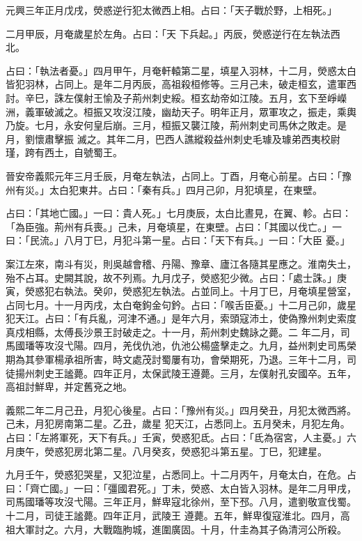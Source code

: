 \begin{pinyinscope}
 元興三年正月戊戌，熒惑逆行犯太微西上相。占曰：「天子戰於野，上相死。」



 二月甲辰，月奄歲星於左角。占曰：「天
 下兵起。」丙辰，熒惑逆行在左執法西北。



 占曰：「執法者憂。」四月甲午，月奄軒轅第二星，填星入羽林，十二月，熒惑太白皆犯羽林，占同上。是年二月丙辰，高祖殺桓修等。三月己未，破走桓玄，遣軍西討。辛巳，誅左僕射王愉及子荊州刺史綏。桓玄劫帝如江陵。五月，玄下至崢嶸洲，義軍破滅之。桓振又攻沒江陵，幽劫天子。明年正月，眾軍攻之，振走，乘輿乃旋。七月，永安何皇后崩。三月，桓振又襲江陵，荊州刺史司馬休之敗走。是月，劉懷肅擊振
 滅之。其年二月，巴西人譙縱殺益州刺史毛璩及璩弟西夷校尉瑾，跨有西土，自號蜀王。



 晉安帝義熙元年三月壬辰，月奄左執法，占同上。丁酉，月奄心前星。占曰：「豫州有災。」太白犯東井。占曰：「秦有兵。」四月己卯，月犯填星，在東壁。



 占曰：「其地亡國。」一曰：貴人死。」七月庚辰，太白比晝見，在翼、軫。占曰：「為臣強。荊州有兵喪。」己未，月奄填星，在東壁。占曰：「其國以伐亡。」一曰：「民流。」八月丁巳，月犯斗第一星。占曰：「天下有兵。」一曰：「大臣
 憂。」



 案江左來，南斗有災，則吳越會稽、丹陽、豫章、廬江各隨其星應之。淮南失土，殆不占耳。史闕其說，故不列焉。九月戊子，熒惑犯少微。占曰：「處士誅。」庚寅，熒惑犯右執法。癸卯，熒惑犯左執法。占並同上。十月丁巳，月奄填星營室，占同七月。十一月丙戌，太白奄鉤金句鈐。占曰：「喉舌臣憂。」十二月己卯，歲星犯天江。占曰：「有兵亂，河津不通。」是年六月，索頭寇沛土，使偽豫州刺史索度真戍相縣，太傅長沙景王討破走之。十一月，荊州刺史魏詠之薨。二
 年二月，司馬國璠等攻沒弋陽。四月，羌伐仇池，仇池公楊盛擊走之。九月，益州刺史司馬榮期為其參軍楊承祖所害，時文處茂討蜀屢有功，會榮期死，乃退。三年十二月，司徒揚州刺史王謐薨。四年正月，太保武陵王遵薨。三月，左僕射孔安國卒。五年，高祖討鮮卑，并定舊兗之地。



 義熙二年二月己丑，月犯心後星。占曰：「豫州有災。」四月癸丑，月犯太微西將。己未，月犯房南第二星。乙丑，歲星
 犯天江，占悉同上。五月癸未，月犯左角。占曰：「左將軍死，天下有兵。」壬寅，熒惑犯氐。占曰：「氐為宿宮，人主憂。」六月庚午，熒惑犯房北第二星。八月癸亥，熒惑犯斗第五星。丁巳，犯建星。



 九月壬午，熒惑犯哭星，又犯泣星，占悉同上。十二月丙午，月奄太白，在危。占曰：「齊亡國。」一曰：「彊國君死。」丁未，熒惑、太白皆入羽林。是年二月甲戌，司馬國璠等攻沒弋陽。三年正月，鮮卑寇北徐州，至下邳。八月，遣劉敬宣伐蜀。十二月，司徒王謐薨。四年正月，武陵王
 遵薨。五年，鮮卑復寇淮北。四月，高祖大軍討之。六月，大戰臨朐城，進圍廣固。十月，什圭為其子偽清河公所殺。




\end{pinyinscope}
